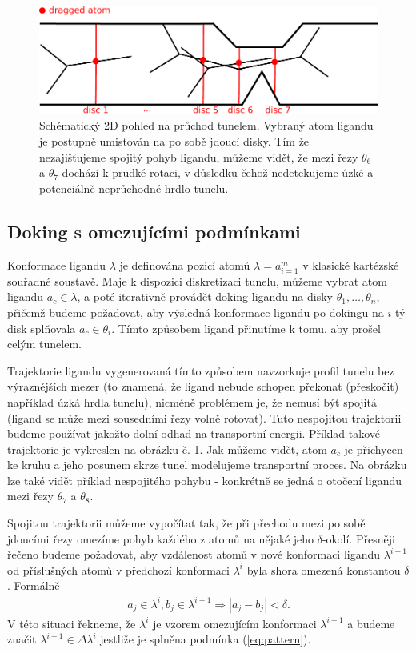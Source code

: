 \begin{figure}[t]
\centering
\includegraphics[width=.8\hsize]{img/tun.pdf}
\caption{Schématický 2D pohled na průchod tunelem. Vybraný atom ligandu je
postupně umisťován na po sobě jdoucí disky. Tím že nezajišťujeme spojitý pohyb
ligandu, můžeme vidět, že mezi řezy $\theta_6$ a $\theta_7$ dochází k prudké rotaci, v
důsledku čehož nedetekujeme úzké a potenciálně neprůchodné hrdlo tunelu.}
\label{fig:lower-bound}
\end{figure}





\subsection{Doking s omezujícími podmínkami}
Konformace ligandu $ \lambda $ je definována pozicí atomů
$ \lambda = {a}^m_{i = 1} $ v klasické kartézské souřadné soustavě. Maje
k dispozici diskretizaci tunelu, můžeme vybrat atom ligandu $ a_c \in \lambda $,
a poté iterativně provádět doking ligandu na disky $ \theta_1, \dots, \theta_n $,
přičemž budeme požadovat, aby výsledná konformace ligandu po dokingu na
$ i $-tý disk splňovala $ a_c \in \theta_i $. Tímto způsobem ligand přinutíme
k tomu, aby prošel celým tunelem.

Trajektorie ligandu vygenerovaná tímto způsobem navzorkuje profil tunelu bez
výraznějších mezer (to znamená, že ligand nebude schopen překonat (přeskočit) například
úzká hrdla tunelu), nicméně problémem je, že nemusí být spojitá (ligand se
může mezi sousedními řezy volně rotovat). Tuto nespojitou trajektorii budeme
používat jakožto dolní odhad na transportní energii. Příklad takové trajektorie
je vykreslen na obrázku č. \ref{fig:lower-bound}. Jak můžeme vidět, atom $ a_c $
je přichycen ke kruhu a jeho posunem skrze tunel modelujeme transportní
proces. Na obrázku lze také vidět příklad nespojitého pohybu - konkrétně
se jedná o otočení ligandu mezi řezy $ \theta_7$ a $\theta_8$.

Spojitou trajektorii můžeme vypočítat tak, že při přechodu mezi po sobě jdoucími
řezy omezíme pohyb každého z atomů na nějaké jeho $ \delta $-okolí. Přesněji řečeno
budeme požadovat, aby vzdálenost atomů v nové konformaci ligandu $ \lambda^{i + 1} $
od příslušných atomů v předchozí konformaci $ \lambda^{i} $ byla shora omezená
konstantou $ \delta $. Formálně
\begin{align}
    a_j \in \lambda^{i}, b_j \in \lambda^{i + 1} \Rightarrow |a_j - b_j| < \delta.
    \label{eq:pattern}
\end{align}
V této situaci řekneme, že $ \lambda^i $ je vzorem omezujícím konformaci
$ \lambda^{i+1} $ a budeme značit $ \lambda^{i+1} \in \Delta \lambda^i $ jestliže
je splněna podmínka (\ref{eq:pattern}).

